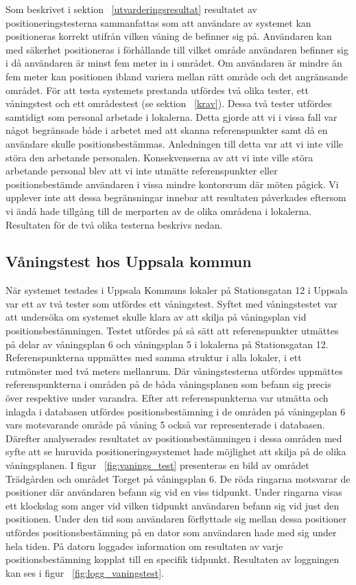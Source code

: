 \documentclass[a4paper,12pt]{article}
\begin{document}
 Som beskrivet i sektion ~\ref{utvarderingsresultat} resultatet av positioneringstesterna sammanfattas som att användare av systemet kan positioneras korrekt utifrån vilken våning de befinner sig på. Användaren kan med säkerhet positioneras i förhållande till vilket område användaren befinner sig i då användaren är minst fem meter in i området. Om användaren är mindre än fem meter kan positionen ibland variera mellan rätt område och det angränsande området.
 För att testa systemets prestanda utfördes två olika tester, ett våningstest och ett områdestest (se sektion ~\ref{krav}). Dessa två tester utfördes samtidigt som personal arbetade i lokalerna. Detta gjorde att vi i vissa fall var något begränsade både i arbetet med att skanna referenspunkter samt då en användare skulle positionsbestämmas. Anledningen till detta var att vi inte ville störa den arbetande personalen. Konsekvenserna av att vi inte ville störa arbetande personal blev att vi inte utmätte referenspunkter eller positionsbestämde användaren i vissa mindre kontorsrum där möten pågick. Vi upplever inte att dessa begränsningar innebar att resultaten påverkades eftersom vi ändå hade tillgång till de merparten av de olika områdena i lokalerna. Resultaten för de två olika testerna beskrivs nedan.


 \subsection{Våningstest hos Uppsala kommun}\label{vaningstest}
 När systemet testades i Uppsala Kommuns lokaler på Stationsgatan 12 i Uppsala var ett av två tester som utfördes ett våningstest. Syftet med våningstestet var att undersöka om systemet skulle klara av att skilja på våningsplan vid positionsbestämningen. Testet utfördes på så sätt att referenspunkter utmättes på delar av våningsplan 6 och våningsplan 5 i lokalerna på Stationsgatan 12. Referenspunkterna uppmättes med samma struktur i alla lokaler, i ett rutmönster med två meters mellanrum. Där våningstesterna utfördes uppmättes referenspunkterna i områden på de båda våningsplanen som befann sig precis över respektive under varandra. Efter att referenspunkterna var utmätta och inlagda i databasen utfördes positionsbestämning i de områden på våningsplan 6 vars motsvarande område på våning 5 också var representerade i databasen. Därefter analyserades resultatet av positionsbestämningen i dessa områden med syfte att se huruvida positioneringssystemet hade möjlighet att skilja på de olika våningsplanen. I figur ~\ref{fig:vanings_test} presenteras en bild av området Trädgården och området Torget på våningsplan 6. De röda ringarna motsvarar de positioner där användaren befann sig vid en viss tidpunkt. Under ringarna visas ett klockslag som anger vid vilken tidpunkt användaren befann sig vid just den positionen. Under den tid som användaren förflyttade sig mellan dessa positioner utfördes positionsbestämning på en dator som användaren hade med sig under hela tiden. På datorn loggades information om resultaten av varje positionsbestämning kopplat till en specifik tidpunkt. Resultaten av loggningen kan ses i figur ~\ref{fig:logg_vaningstest}.
\end{document}
